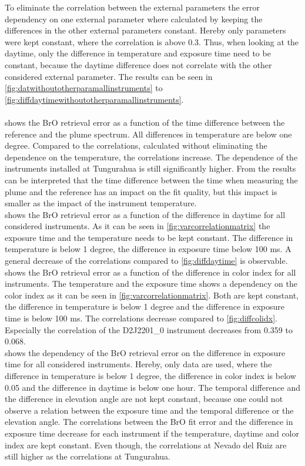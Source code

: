\documentclass  [
  paper    = a4,
  BCOR     = 10mm,
  twoside,
  fontsize = 12pt,
  fleqn,
  toc      = bibnumbered,
  toc      = listofnumbered,
  numbers  = noendperiod,
  headings = normal,
  listof   = leveldown,
  version  = 3.03
]                                       {scrreprt}
\begin{document}
%
To eliminate the correlation between the external parameters the   error dependency on one external parameter where calculated by keeping the differences in the other external parameters constant. Hereby only parameters were kept constant, where the correlation is above 0.3. Thus, when looking at the daytime, only the difference in temperature and exposure time need to be constant, because the daytime difference does not correlate with the other considered external parameter. The results can be seen in \cref{fig:datwithoutotherparamallinstruments} to \cref{fig:diffdaytimewithoutotherparamallinstruments}.\\
\\
 shows the BrO retrieval error as a function of the time difference between the reference and the plume spectrum. All differences in temperature are below one degree. Compared to the correlations, calculated without eliminating the dependence on the temperature, the correlations increase. The dependence of the instruments installed at Tungurahua is still significantly higher. From the results can be interpreted that the time difference between the time when measuring the plume and the reference has an impact on the fit quality, but this impact is smaller as the impact of the instrument temperature.\\
 shows the BrO retrieval error as a function of the difference in daytime for all considered instruments. As it can be seen in \cref{fig:varcorrelationmatrix} the exposure time and the temperature needs to be kept constant. The difference in temperature is below 1 degree, the difference in exposure time below 100 ms. A general decrease of the correlations compared to \cref{fig:diffdaytime} is observable.\\
%
 shows the BrO retrieval error as a function of the difference in color index for all instruments. The temperature and the exposure time shows a dependency on the color index as it can be seen in \cref{fig:varcorrelationmatrix}. Both are kept constant, the difference in temperature is below 1 degree and the difference in exposure time is below 100 ms. The correlations decrease compared to \cref{fig:diffcolidx}. Especially the correlation of the D2J2201\_0 instrument decreases from 0.359 to 0.068.\\
%
 shows the dependency of the BrO retrieval error on the difference in exposure time for all considered instruments. Hereby, only data are used, where the difference in temperature is below 1 degree, the difference in color index is below 0.05 and the difference in daytime is below one hour. The temporal difference and the difference in elevation angle are not kept constant, because one could not observe a relation between the exposure time and the temporal difference or the elevation angle. The correlations between the BrO fit error and the difference in exposure time decrease for each instrument if the temperature, daytime and color index are kept constant. Even though, the correlations at Nevado del Ruiz are still higher as the correlations at Tungurahua.\\
\end{document}
